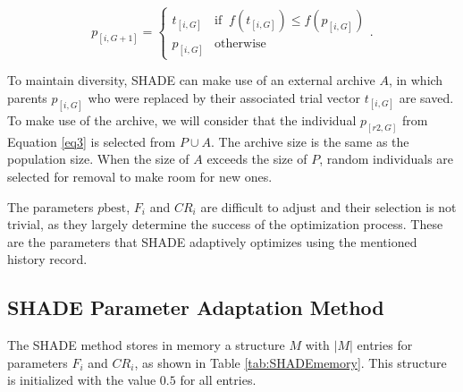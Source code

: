 \documentclass[review]{elsarticle}
\begin{document}
\begin{equation}
p_{[i,G + 1]} = \left\{ \begin{array}{lc}
t_{[i,G]} &   \text{if} \;\; f(t_{[i,G]}) \le f(p_{[i,G]}) \\
p_{[i,G]} &  \text{otherwise}
\end{array}
\right..
\label{eq5}
\end{equation}

To maintain diversity, SHADE can make use of an external archive $A$, in which parents $p_{[i,G]}$ who were replaced by their associated trial vector $t_{[i,G]}$ are saved. To make use of the archive, we will consider that the individual $p_{[r2,G]}$ from Equation \eqref{eq3} is selected from $P \cup A$. The archive size is the same as the population size. When the size of $A$ exceeds the size of $P$, random individuals are selected for removal to make room for new ones.

The parameters $p\text{best}$, $F_i$ and $CR_i$ are difficult to adjust and their selection is not trivial, as they largely determine the success of the optimization process. These are the parameters that SHADE adaptively optimizes using the mentioned history record.

\subsection{SHADE Parameter Adaptation Method}

The SHADE method stores in memory a structure $M$ with $|M|$ entries for parameters $F_i$ and $CR_i$, as shown in Table \ref{tab:SHADEmemory}. This structure is initialized with the value $0.5$ for all entries.

\begin{table}[!h]
	\centering
	\setlength{\tabcolsep}{13pt}
	\caption{Historical memory $M_{CR}$, $M_{F}$ used by SHADE \cite{tanabe2013success}.}
	\label{tab:SHADEmemory}
\end{table}
\end{document}
